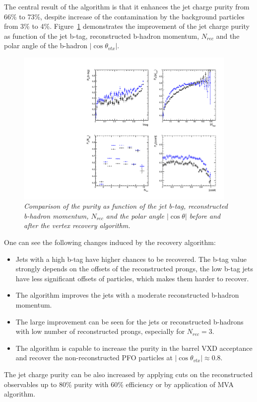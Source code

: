 The central result of the algorithm is that it enhances the jet charge purity from 66\% to 73\%, despite increase of the contamination by the  background particles from 3\% to 4\%.
Figure~\ref{fig:RecoveryPurityComparison_3} demonstrates the improvement of the jet charge purity as function of the jet b-tag, reconstructed b-hadron momentum, $N_{rec}$ and the polar angle of the b-hadron  $|\cos\theta_{vtx}|$.
\begin{figure}[h]
{\centering
    \includegraphics[width=0.95\textwidth]{ILD/plots/recovery-purity-comparison.pdf}
    \caption{\sl Comparison of the purity as function of the jet b-tag, reconstructed b-hadron momentum, $N_{rec}$ and the polar angle $|\cos\theta|$ before and after the vertex recovery algorithm.  
    }
    \label{fig:RecoveryPurityComparison_3}
  }
\end{figure}
One can see the following changes induced by the recovery algorithm:
\begin{itemize}
\item Jets with a high b-tag have higher chances to be recovered. The b-tag value strongly depends on the offsets of the reconstructed prongs, the low b-tag jets have less significant offsets of particles, which makes them  harder to recover. 
\item The algorithm improves the jets with a moderate reconstructed b-hadron momentum. %
\item The large improvement can be seen for the jets or reconstructed b-hadrons with low number of reconstructed prongs, especially for $N_{rec}=3$.%
\item The algorithm is capable to increase the purity in the barrel VXD acceptance and recover the non-reconstructed PFO particles at $|\cos\theta_{vtx}| \approx 0.8$. 
\end{itemize}
The jet charge purity can be also increased by applying cuts on the reconstructed observables up to 80\% purity with 60\% efficiency or by application of MVA algorithm.

